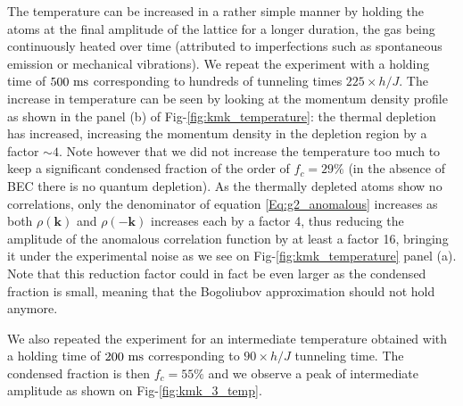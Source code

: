 \label{sec:kmk_temperature}

The temperature can be increased in a rather simple manner by holding the atoms at the final amplitude of the lattice for a longer duration, the gas being continuously heated over time (attributed to imperfections such as spontaneous emission or mechanical vibrations). We repeat the experiment with a holding time of $500 \ \rm{ms}$ corresponding to hundreds of tunneling times $225 \times h/J$. The increase in temperature can be seen by looking at the momentum density profile as shown in the panel (b) of Fig-\ref{fig:kmk_temperature}: the thermal depletion has increased, increasing the momentum density in the depletion region by a factor $\sim 4$. Note however that we did not increase the temperature too much to keep a significant condensed fraction of the order of $f_c = 29 \%$ (in the absence of BEC there is no quantum depletion). As the thermally depleted atoms show no \kmk correlations, only the denominator of equation \ref{Eq:g2_anomalous} increases as both $\rho(\bm{k})$ and $\rho(-\bm{k})$ increases each by a factor 4, thus reducing the amplitude of the anomalous correlation function by at least a factor 16, bringing it under the experimental noise as we see on Fig-\ref{fig:kmk_temperature} panel (a). Note that this reduction factor could in fact be even larger as the condensed fraction is small, meaning that the Bogoliubov approximation should not hold anymore. 

We also repeated the experiment for an intermediate temperature obtained with a holding time of $200 \ \rm{ms}$ corresponding to $90 \times h/J$ tunneling time. The condensed fraction is then $f_c=55 \%$ and we observe a peak of intermediate amplitude as shown on Fig-\ref{fig:kmk_3_temp}.

